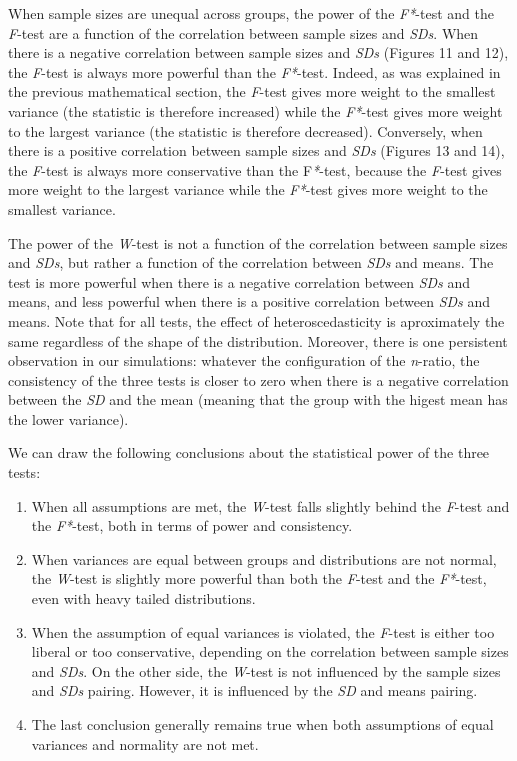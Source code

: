 \documentclass[man,floatsintext]{apa6}
\providecommand{\tightlist}{%
  \setlength{\itemsep}{0pt}\setlength{\parskip}{0pt}}
\begin{document}
When sample sizes are unequal across groups, the power of the \emph{F*}-test and the \emph{F}-test are a function of the correlation between sample sizes and \emph{SDs}. When there is a negative correlation between sample sizes and \emph{SDs} (Figures 11 and 12), the \emph{F}-test is always more powerful than the \emph{F*}-test. Indeed, as was explained in the previous mathematical section, the \emph{F}-test gives more weight to the smallest variance (the statistic is therefore increased) while the \emph{F*}-test gives more weight to the largest variance (the statistic is therefore decreased). Conversely, when there is a positive correlation between sample sizes and \emph{SDs} (Figures 13 and 14), the \emph{F}-test is always more conservative than the F\emph{*}-test, because the \emph{F}-test gives more weight to the largest variance while the \emph{F*}-test gives more weight to the smallest variance.

The power of the \emph{W}-test is not a function of the correlation between sample sizes and \emph{SDs}, but rather a function of the correlation between \emph{SDs} and means. The test is more powerful when there is a negative correlation between \emph{SDs} and means, and less powerful when there is a positive correlation between \emph{SDs} and means. Note that for all tests, the effect of heteroscedasticity is aproximately the same regardless of the shape of the distribution. Moreover, there is one persistent observation in our simulations: whatever the configuration of the \emph{n}-ratio, the consistency of the three tests is closer to zero when there is a negative correlation between the \emph{SD} and the mean (meaning that the group with the higest mean has the lower variance).

We can draw the following conclusions about the statistical power of the three tests:

\begin{enumerate}
\def\labelenumi{\arabic{enumi})}
\tightlist
\item
  When all assumptions are met, the \emph{W}-test falls slightly behind the \emph{F}-test and the \emph{F*}-test, both in terms of power and consistency.
\item
  When variances are equal between groups and distributions are not normal, the \emph{W}-test is slightly more powerful than both the \emph{F}-test and the \emph{F*}-test, even with heavy tailed distributions.
\item
  When the assumption of equal variances is violated, the \emph{F}-test is either too liberal or too conservative, depending on the correlation between sample sizes and \emph{SDs}. On the other side, the \emph{W}-test is not influenced by the sample sizes and \emph{SDs} pairing. However, it is influenced by the \emph{SD} and means pairing.
\item
  The last conclusion generally remains true when both assumptions of equal variances and normality are not met.
\end{enumerate}
\end{document}
